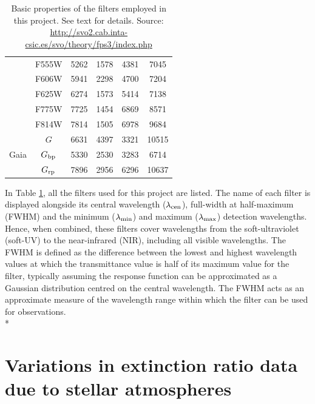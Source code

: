 \documentclass[12pt, a4paper]{report}
\begin{document}
\begin{table}
\begin{center}
\begin{tabular}{cccccc}
& F555W & 5262 & 1578 & 4381 & 7045 \\ %
& F606W & 5941 & 2298 & 4700 & 7204 \\ %
& F625W & 6274 & 1573 & 5414 & 7138 \\ %
& F775W & 7725 & 1454 & 6869 & 8571 \\ %
& F814W & 7814 & 1505 & 6978 & 9684 \\ %
\hline
& $G$ & 6631 & 4397 & 3321 & 10515 \\ %
Gaia & $G_{\textnormal{bp}}$ & 5330 & 2530 & 3283 & 6714 \\ %
& $G_{\textnormal{rp}}$ & 7896 & 2956 & 6296 & 10637 \\ %
\hline

\end{tabular}
\caption{Basic properties of the filters employed in this project. See text for details. Source: \protect\url{http://svo2.cab.inta-csic.es/svo/theory/fps3/index.php}}
\label{filter_basics}
\end{center}
\end{table}

In Table \ref{filter_basics}, all the filters used for this project are listed. The name of each filter is displayed alongside its central wavelength ($\lambda_{\textnormal{cen}}$), full-width at half-maximum (FWHM) and the minimum ($\lambda_{\textnormal{min}}$) and maximum ($\lambda_{\textnormal{max}}$) detection wavelengths. Hence, when combined, these filters cover wavelengths from the soft-ultraviolet (soft-UV) to the near-infrared (NIR), including all visible wavelengths. The FWHM is defined as the difference between the lowest and highest wavelength values at which the transmittance value is half of its maximum value for the filter, typically assuming the response function can be approximated as a Gaussian distribution centred on the central wavelength. The FWHM acts as an approximate measure of the wavelength range within which the filter can be used for observations.\\*

\section{Variations in extinction ratio data due to stellar atmospheres} \label{desc_var}
\end{document}
